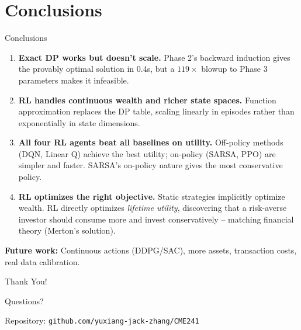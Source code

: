\documentclass[aspectratio=169, 11pt]{beamer}
\begin{document}
\section{Conclusions}

\begin{frame}{Conclusions}

\begin{enumerate}
    \item \textbf{Exact DP works but doesn't scale.}
    Phase 2's backward induction gives the provably optimal solution in 0.4s,
    but a $119\times$ blowup to Phase 3 parameters makes it infeasible.

    \vspace{0.4em}
    \item \textbf{RL handles continuous wealth and richer state spaces.}
    Function approximation replaces the DP table, scaling linearly in episodes
    rather than exponentially in state dimensions.

    \vspace{0.4em}
    \item \textbf{All four RL agents beat all baselines on utility.}
    Off-policy methods (DQN, Linear Q) achieve the best utility; on-policy (SARSA, PPO)
    are simpler and faster. SARSA's on-policy nature gives the most conservative policy.

    \vspace{0.4em}
    \item \textbf{RL optimizes the right objective.}
    Static strategies implicitly optimize wealth. RL directly optimizes \textit{lifetime utility},
    discovering that a risk-averse investor should consume more and invest conservatively
    -- matching financial theory (Merton's solution).
\end{enumerate}

\vspace{0.5em}
\textbf{Future work:} Continuous actions (DDPG/SAC), more assets, transaction costs, real data calibration.
\end{frame}
\begin{frame}{}
\centering
\vspace{2em}
{\Huge Thank You!}

\vspace{1.5em}
{\Large Questions?}

\vspace{2em}
\normalsize
Repository: \texttt{github.com/yuxiang-jack-zhang/CME241}
\end{frame}
\end{document}
